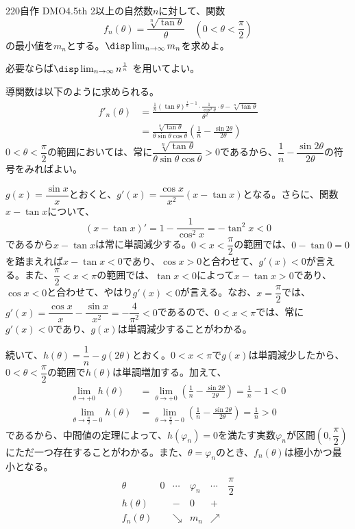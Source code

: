 \begin{prob}{220}{}{自作 DMO4.5th}
 2以上の自然数$n$に対して、関数
 \[ f_n(\theta)=\frac{\sqrt[n]{\tan\theta}}{\theta} \quad (0<\theta<\frac{\pi}{2}) \]
 の最小値を$m_n$とする。$\disp \lim_{n\to\infty} m_n$を求めよ。

 必要ならば$\disp \lim_{n\to\infty} n^{\frac{1}{n}}$ を用いてよい。
\end{prob}
導関数は以下のように求められる。
\begin{align*}
 f'_n(\theta)&=\frac{\frac{1}{n}(\tan\theta)^{\frac{1}{n}-1}\cdot\frac{1}{\cos^2\theta}\cdot\theta-\sqrt[n]{\tan\theta}}{\theta^2} \\
 &=\frac{\sqrt[n]{\tan\theta}}{\theta\sin\theta\cos\theta}\left(\frac{1}{n}-\frac{\sin 2\theta}{2\theta}\right)
\end{align*}
$0<\theta<\dfrac{\pi}{2}$の範囲においては、常に$\dfrac{\sqrt[n]{\tan\theta}}{\theta\sin\theta\cos\theta}>0$であるから、$\dfrac{1}{n}-\dfrac{\sin 2\theta}{2\theta}$の符号をみればよい。

$g(x)=\dfrac{\sin x}{x}$とおくと、$g'(x)=\dfrac{\cos x}{x^2}(x-\tan x)$となる。さらに、関数$x-\tan x$について、
\[ (x-\tan x)'=1-\frac{1}{\cos^2 x}=-\tan^2 x < 0 \]
であるから$x-\tan x$は常に単調減少する。$0<x<\dfrac{\pi}{2}$の範囲では、$0-\tan 0=0$を踏まえれば$x-\tan x<0$であり、$\cos x>0$と合わせて、$g'(x)<0$が言える。また、$\dfrac{\pi}{2}<x<\pi$の範囲では、$\tan x<0$によって$x-\tan x>0$であり、$\cos x<0$と合わせて、やはり$g'(x)<0$が言える。なお、$x=\dfrac{\pi}{2}$では、$g'(x)=\dfrac{\cos x}{x}-\dfrac{\sin x}{x^2}=-\dfrac{4}{\pi^2}<0$であるので、$0<x<\pi$では、常に$g'(x)<0$であり、$g(x)$は単調減少することがわかる。

続いて、$h(\theta)=\dfrac{1}{n}-g(2\theta)$とおく。$0<x<\pi$で$g(x)$は単調減少したから、$0<\theta<\dfrac{\pi}{2}$の範囲で$h(\theta)$は単調増加する。加えて、
\begin{align*}
 \lim_{\theta\to +0} h(\theta)&=\lim_{\theta\to +0} \left(\frac{1}{n}-\frac{\sin 2\theta}{2\theta}\right)=\frac{1}{n}-1 < 0 \\
 \lim_{\theta\to \frac{\pi}{2}-0}h(\theta)&=\lim_{\theta\to \frac{\pi}{2}-0} \left(\frac{1}{n}-\frac{\sin 2\theta}{2\theta}\right)=\frac{1}{n}>0
\end{align*}
であるから、中間値の定理によって、$h(\varphi_n)=0$を満たす実数$\varphi_n$が区間$\left(0, \dfrac{\pi}{2}\right)$にただ一つ存在することがわかる。また、$\theta=\varphi_n$のとき、$f_n(\theta)$は極小かつ最小となる。
\begin{align*}
 \begin{array}{c|c|c|c|c|c}
  \theta & 0 & \cdots & \varphi_n & \cdots & \dfrac{\pi}{2} \\[1.0ex] \hline
  h(\theta) & & - & 0 & + & \\[1.0ex] \hline
  f_n(\theta) & & \searrow & m_n & \nearrow & \\
 \end{array}
\end{align*}

